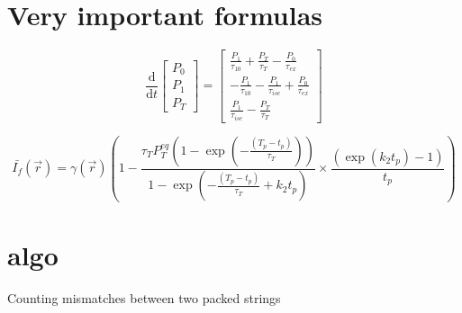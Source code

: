 \lipsum[3-8]


\section{Very important formulas}
\lipsum[2]

\begin{equation}\label{eqn:rate_eqns}
\frac{\textrm{d}}{\textrm{d}t}\left[
\begin{array}{l}
P_{\textit{0}} \\
P_{\textit{1}} \\
P_{\textit{T}}
\end{array}
\right] =
\left[
\begin{array}{l}
\frac{P_{\textit{1}}}{\tau_{\textit{10}}} + \frac{P_{\textit{T}}}{\tau_{\textit{T}}} - \frac{P_{\textit{0}}}{\tau_{\textit{ex}}} \\
- \frac{P_{\textit{1}}}{\tau_{\textit{10}}} - \frac{P_{\textit{1}}}{\tau_{isc}} + \frac{P_{\textit{0}}}{\tau_{\textit{ex}}} \\
\frac{P_{\textit{1}}}{\tau_{isc}} -  \frac{P_{\textit{T}}}{\tau_{\textit{T}}}
\end{array}
\right]
\end{equation}

\lipsum[3]


\begin{equation}\label{eqn:avgfluorescence}
\bar{I_{f}}(\vec{r})
	= \gamma(\vec{r}) \left(1 - \frac{\tau_{\textit{T}} P_{\textit{T}}^{{eq}}\left(1-\exp \left(-\frac{(T_p - t_p)}{\tau_{\textit{T}}}\right)\right)}{1-\exp\left(-\frac{(T_p - t_p)}{\tau_{\textit{T}}} + k_{\textit{2}} t_p\right)} \times \frac{\left(\exp\left(k_{\textit{2}} t_p\right)-1\right)}{t_p} \right)
\end{equation}

\lipsum[3]

\section{algo}

\begin{algorithm}[H]
    \caption{Counting mismatches between two packed  strings
      \label{alg:packed-dna-hamming}}
    \begin{algorithmic}[1]
      \Statex
         
          \EndIf
        \EndFor
        \State \Return{$\delta$}
      \EndFunction
    \end{algorithmic}
  \end{algorithm}